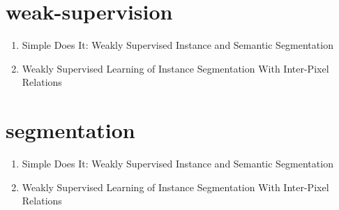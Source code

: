 \documentclass[acmlarge]{acmart}
\begin{document}
\section{weak-supervision}
\begin{enumerate}
	\item Simple Does It: Weakly Supervised Instance and Semantic Segmentation \cite{Khoreva2017SimpleDI}
	\item Weakly Supervised Learning of Instance Segmentation With Inter-Pixel Relations \cite{Ahn2019WeaklySL}
\end{enumerate}
\section{segmentation}
\begin{enumerate}
	\subsection{instance}
	\begin{enumerate}
	\end{enumerate}
	\subsection{semantic}
	\begin{enumerate}
	\end{enumerate}
	\item Simple Does It: Weakly Supervised Instance and Semantic Segmentation \cite{Khoreva2017SimpleDI}
	\item Weakly Supervised Learning of Instance Segmentation With Inter-Pixel Relations \cite{Ahn2019WeaklySL}
\end{enumerate}
\end{document}
